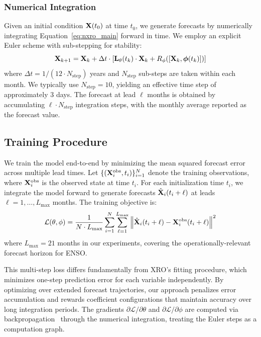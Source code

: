\subsubsection{Numerical Integration}

Given an initial condition $\mathbf{X}(t_0)$ at time $t_0$, we generate forecasts by numerically integrating Equation~\ref{eq:nxro_main} forward in time. We employ an explicit Euler scheme with sub-stepping for stability:
\begin{equation}
    \mathbf{X}_{k+1} = \mathbf{X}_k + \Delta t \cdot \left[ \mathbf{L}_\theta(t_k) \cdot \mathbf{X}_k + R_\phi([\mathbf{X}_k, \boldsymbol{\phi}(t_k)]) \right]
\end{equation}
where $\Delta t = 1/(12 \cdot N_{\text{step}})$ years and $N_{\text{step}}$ sub-steps are taken within each month. We typically use $N_{\text{step}} = 10$, yielding an effective time step of approximately 3 days. The forecast at lead $\ell$ months is obtained by accumulating $\ell \cdot N_{\text{step}}$ integration steps, with the monthly average reported as the forecast value.

\subsection{Training Procedure}

We train the model end-to-end by minimizing the mean squared forecast error across multiple lead times. Let $\{(\mathbf{X}_i^{\text{obs}}, t_i)\}_{i=1}^N$ denote the training observations, where $\mathbf{X}_i^{\text{obs}}$ is the observed state at time $t_i$. For each initialization time $t_i$, we integrate the model forward to generate forecasts $\hat{\mathbf{X}}_i(t_i + \ell)$ at leads $\ell = 1, \ldots, L_{\max}$ months. The training objective is:
\begin{equation}
    \mathcal{L}(\theta, \phi) = \frac{1}{N \cdot L_{\max}} \sum_{i=1}^{N} \sum_{\ell=1}^{L_{\max}} \left\| \hat{\mathbf{X}}_i(t_i + \ell) - \mathbf{X}_i^{\text{obs}}(t_i + \ell) \right\|^2
    \label{eq:loss}
\end{equation}
where $L_{\max} = 21$ months in our experiments, covering the operationally-relevant forecast horizon for ENSO.

This multi-step loss differs fundamentally from XRO's fitting procedure, which minimizes one-step prediction error for each variable independently. By optimizing over extended forecast trajectories, our approach penalizes error accumulation and rewards coefficient configurations that maintain accuracy over long integration periods. The gradients $\partial \mathcal{L} / \partial \theta$ and $\partial \mathcal{L} / \partial \phi$ are computed via backpropagation~\cite{rumelhart1986learning} through the numerical integration, treating the Euler steps as a computation graph.

